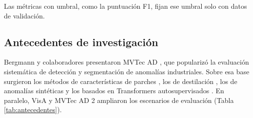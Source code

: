 \documentclass[12pt,oneside]{report}
\begin{document}
Las métricas con umbral, como la puntuación F1, fijan ese umbral solo con datos de validación.

\subsection{Antecedentes de investigación}

Bergmann y colaboradores presentaron MVTec AD \cite{bergmann2019,bergmann2021}, que popularizó la evaluación sistemática de detección y segmentación de anomalías industriales. Sobre esa base surgieron los métodos de características de parches \cite{rippel2020,defard2021,roth2022}, los de destilación \cite{bergmann2020,deng2022,batzner2024}, los de anomalías sintéticas \cite{li2021,zavrtanik2021} y los basados en Transformers autosupervisados \cite{guo2025}. En paralelo, VisA \cite{zou2022} y MVTec AD 2 \cite{heckler2026} ampliaron los escenarios de evaluación (Tabla \ref{tab:antecedentes}).
\end{document}
